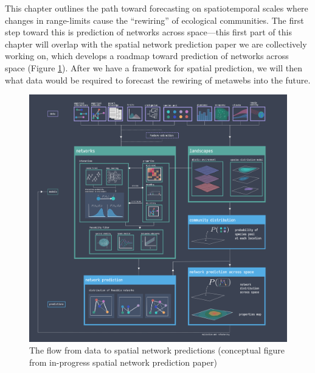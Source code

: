 \documentclass[]{article}
\begin{document}
This chapter outlines the path toward  forecasting on spatiotemporal scales where changes in  range-limits cause the ``rewiring'' of ecological communities. The first step toward this is prediction of networks across space---this first part of this chapter will overlap with the spatial network prediction paper we are collectively working on, which develops a roadmap toward prediction of networks across space (Figure \ref{fig:network_prediction}). 
After we have a framework for spatial prediction, we will then what data would be required to forecast the rewiring of metawebs into the future. 


\begin{figure}[h]
    \centering
    \includegraphics[width=17cm]{figs/combined_spatial_network_prediction_v4.png}
    \caption{The flow from data to spatial network predictions (conceptual figure from in-progress spatial network prediction paper)}
    \label{fig:network_prediction}
\end{figure}


\clearpage
\end{document}
